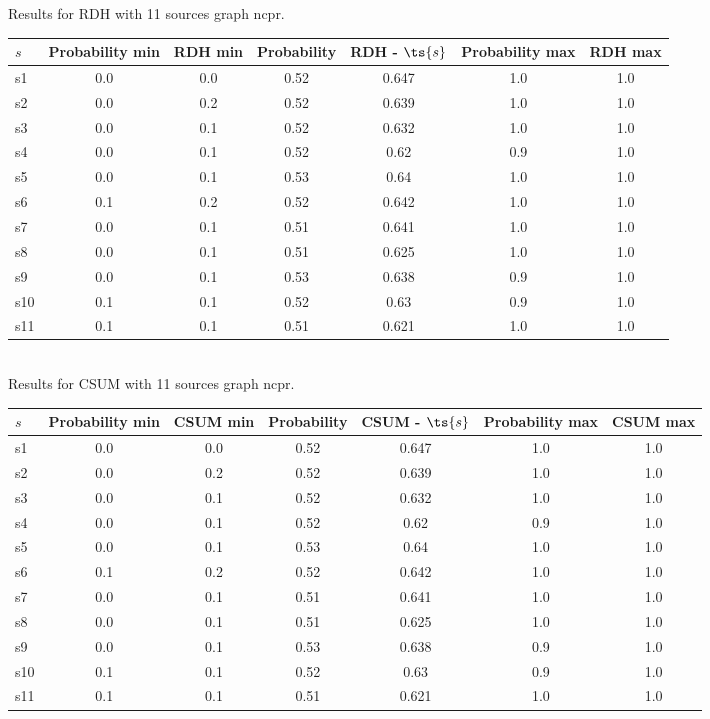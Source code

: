 \documentclass{article}
\begin{document}
\noindent Results for RDH with 11 sources graph ncpr.

\noindent\begin{tabular}{|l|c|c|c|c|c|c|}
\hline
$s$& Probability min & RDH min & Probability & RDH - $\ts{s}$ & Probability max & RDH max\\
\hline
s1 &0.0 & 0.0 & 0.52 & 0.647 & 1.0 & 1.0\\
\hline
s2 &0.0 & 0.2 & 0.52 & 0.639 & 1.0 & 1.0\\
\hline
s3 &0.0 & 0.1 & 0.52 & 0.632 & 1.0 & 1.0\\
\hline
s4 &0.0 & 0.1 & 0.52 & 0.62 & 0.9 & 1.0\\
\hline
s5 &0.0 & 0.1 & 0.53 & 0.64 & 1.0 & 1.0\\
\hline
s6 &0.1 & 0.2 & 0.52 & 0.642 & 1.0 & 1.0\\
\hline
s7 &0.0 & 0.1 & 0.51 & 0.641 & 1.0 & 1.0\\
\hline
s8 &0.0 & 0.1 & 0.51 & 0.625 & 1.0 & 1.0\\
\hline
s9 &0.0 & 0.1 & 0.53 & 0.638 & 0.9 & 1.0\\
\hline
s10 &0.1 & 0.1 & 0.52 & 0.63 & 0.9 & 1.0\\
\hline
s11 &0.1 & 0.1 & 0.51 & 0.621 & 1.0 & 1.0\\
\hline
\end{tabular}\\

\noindent Results for CSUM with 11 sources graph ncpr.

\noindent\begin{tabular}{|l|c|c|c|c|c|c|}
\hline
$s$& Probability min & CSUM min & Probability & CSUM - $\ts{s}$ & Probability max & CSUM max\\
\hline
s1 &0.0 & 0.0 & 0.52 & 0.647 & 1.0 & 1.0\\
\hline
s2 &0.0 & 0.2 & 0.52 & 0.639 & 1.0 & 1.0\\
\hline
s3 &0.0 & 0.1 & 0.52 & 0.632 & 1.0 & 1.0\\
\hline
s4 &0.0 & 0.1 & 0.52 & 0.62 & 0.9 & 1.0\\
\hline
s5 &0.0 & 0.1 & 0.53 & 0.64 & 1.0 & 1.0\\
\hline
s6 &0.1 & 0.2 & 0.52 & 0.642 & 1.0 & 1.0\\
\hline
s7 &0.0 & 0.1 & 0.51 & 0.641 & 1.0 & 1.0\\
\hline
s8 &0.0 & 0.1 & 0.51 & 0.625 & 1.0 & 1.0\\
\hline
s9 &0.0 & 0.1 & 0.53 & 0.638 & 0.9 & 1.0\\
\hline
s10 &0.1 & 0.1 & 0.52 & 0.63 & 0.9 & 1.0\\
\hline
s11 &0.1 & 0.1 & 0.51 & 0.621 & 1.0 & 1.0\\
\hline
\end{tabular}\\
\end{document}
